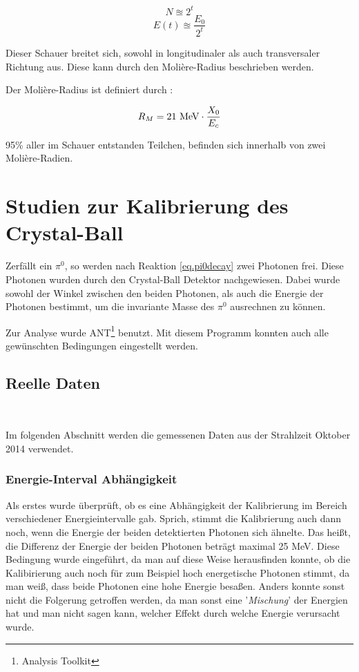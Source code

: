 \documentclass[a4paper,11pt,oneside,final,german,openbib,pdftex]{scrbook}
\begin{document}
{\begin{equation}
N\approxeq 2^t
\end{equation}
\begin{equation}
E(t) \approxeq \frac{E_0}{2^t}
\end{equation}

Dieser Schauer breitet sich, sowohl in longitudinaler als auch transversaler Richtung aus. Diese kann durch den Molière-Radius beschrieben werden. 

Der Molière-Radius ist definiert durch \cite{Leo87}:

\begin{equation}
R_M = 21 \textnormal{ MeV}\cdot \frac{X_0}{E_c}
\end{equation}

95\% aller im Schauer entstanden Teilchen, befinden sich innerhalb von zwei Molière-Radien. 

\chapter{Studien zur Kalibrierung des Crystal-Ball}

Zerf\"allt ein $\pi^0$, so werden nach Reaktion \ref{eq.pi0decay} zwei Photonen frei. Diese Photonen wurden durch den Crystal-Ball Detektor nachgewiesen. Dabei wurde sowohl der Winkel zwischen den beiden Photonen, als auch die Energie der Photonen bestimmt, um die invariante Masse des $\pi^0$ ausrechnen zu k\"onnen.

Zur Analyse wurde ANT\footnote{Analysis Toolkit} benutzt. Mit diesem Programm konnten auch alle gew\"unschten Bedingungen eingestellt werden. 

\section{Reelle Daten}\
\label{sec:Reelle-Daten}

Im folgenden Abschnitt werden die gemessenen Daten aus der Strahlzeit Oktober 2014 verwendet.

\subsection{Energie-Interval Abhängigkeit}
\label{sec:Energie-Interval-Abhaengigkeit}

Als erstes wurde überprüft, ob es eine Abhängigkeit der Kalibrierung im Bereich verschiedener Energieintervalle gab. Sprich, stimmt die Kalibrierung auch dann noch, wenn die Energie der beiden detektierten Photonen sich ähnelte. Das hei{\ss}t, die Differenz der Energie der beiden Photonen betr\"agt maximal 25 MeV. Diese Bedingung wurde eingef\"uhrt, da man auf diese Weise herausfinden konnte, ob die Kalibirierung auch noch f\"ur zum Beispiel hoch energetische Photonen stimmt, da man wei{\ss}, dass beide Photonen eine hohe Energie besa{\ss}en. Anders konnte sonst nicht die Folgerung getroffen werden, da man sonst eine '\textit{Mischung}' der Energien hat und man nicht sagen kann, welcher Effekt durch welche Energie verursacht wurde.

}
\end{document}
